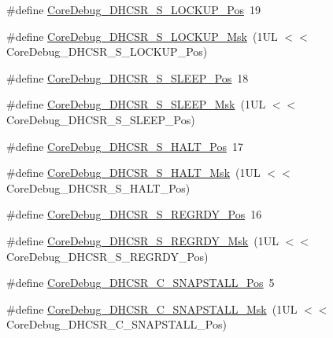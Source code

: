 \begin{DoxyCompactItemize}
\item 
\#define \hyperlink{group___c_m_s_i_s___core_debug_ga2900dd56a988a4ed27ad664d5642807e}{Core\+Debug\+\_\+\+D\+H\+C\+S\+R\+\_\+\+S\+\_\+\+L\+O\+C\+K\+U\+P\+\_\+\+Pos}~19
\item 
\#define \hyperlink{group___c_m_s_i_s___core_debug_ga7b67e4506d7f464ef5dafd6219739756}{Core\+Debug\+\_\+\+D\+H\+C\+S\+R\+\_\+\+S\+\_\+\+L\+O\+C\+K\+U\+P\+\_\+\+Msk}~(1\+U\+L $<$$<$ Core\+Debug\+\_\+\+D\+H\+C\+S\+R\+\_\+\+S\+\_\+\+L\+O\+C\+K\+U\+P\+\_\+\+Pos)
\item 
\#define \hyperlink{group___c_m_s_i_s___core_debug_ga349ccea33accc705595624c2d334fbcb}{Core\+Debug\+\_\+\+D\+H\+C\+S\+R\+\_\+\+S\+\_\+\+S\+L\+E\+E\+P\+\_\+\+Pos}~18
\item 
\#define \hyperlink{group___c_m_s_i_s___core_debug_ga98d51538e645c2c1a422279cd85a0a25}{Core\+Debug\+\_\+\+D\+H\+C\+S\+R\+\_\+\+S\+\_\+\+S\+L\+E\+E\+P\+\_\+\+Msk}~(1\+U\+L $<$$<$ Core\+Debug\+\_\+\+D\+H\+C\+S\+R\+\_\+\+S\+\_\+\+S\+L\+E\+E\+P\+\_\+\+Pos)
\item 
\#define \hyperlink{group___c_m_s_i_s___core_debug_ga760a9a0d7f39951dc3f07d01f1f64772}{Core\+Debug\+\_\+\+D\+H\+C\+S\+R\+\_\+\+S\+\_\+\+H\+A\+L\+T\+\_\+\+Pos}~17
\item 
\#define \hyperlink{group___c_m_s_i_s___core_debug_ga9f881ade3151a73bc5b02b73fe6473ca}{Core\+Debug\+\_\+\+D\+H\+C\+S\+R\+\_\+\+S\+\_\+\+H\+A\+L\+T\+\_\+\+Msk}~(1\+U\+L $<$$<$ Core\+Debug\+\_\+\+D\+H\+C\+S\+R\+\_\+\+S\+\_\+\+H\+A\+L\+T\+\_\+\+Pos)
\item 
\#define \hyperlink{group___c_m_s_i_s___core_debug_ga20a71871ca8768019c51168c70c3f41d}{Core\+Debug\+\_\+\+D\+H\+C\+S\+R\+\_\+\+S\+\_\+\+R\+E\+G\+R\+D\+Y\+\_\+\+Pos}~16
\item 
\#define \hyperlink{group___c_m_s_i_s___core_debug_gac4cd6f3178de48f473d8903e8c847c07}{Core\+Debug\+\_\+\+D\+H\+C\+S\+R\+\_\+\+S\+\_\+\+R\+E\+G\+R\+D\+Y\+\_\+\+Msk}~(1\+U\+L $<$$<$ Core\+Debug\+\_\+\+D\+H\+C\+S\+R\+\_\+\+S\+\_\+\+R\+E\+G\+R\+D\+Y\+\_\+\+Pos)
\item 
\#define \hyperlink{group___c_m_s_i_s___core_debug_ga85747214e2656df6b05ec72e4d22bd6d}{Core\+Debug\+\_\+\+D\+H\+C\+S\+R\+\_\+\+C\+\_\+\+S\+N\+A\+P\+S\+T\+A\+L\+L\+\_\+\+Pos}~5
\item 
\#define \hyperlink{group___c_m_s_i_s___core_debug_ga53aa99b2e39a67622f3b9973e079c2b4}{Core\+Debug\+\_\+\+D\+H\+C\+S\+R\+\_\+\+C\+\_\+\+S\+N\+A\+P\+S\+T\+A\+L\+L\+\_\+\+Msk}~(1\+U\+L $<$$<$ Core\+Debug\+\_\+\+D\+H\+C\+S\+R\+\_\+\+C\+\_\+\+S\+N\+A\+P\+S\+T\+A\+L\+L\+\_\+\+Pos)
$$
\end{DoxyCompactItemize}
